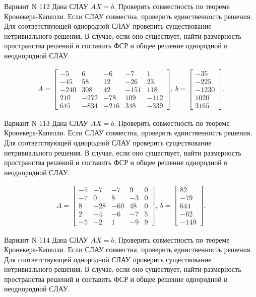\documentclass[11pt]{report}
\begin{document}
Вариант N 112
Дана СЛАУ $AX = b$,
Проверить совместность по теореме Кронекера-Капелли. Если СЛАУ совместна, проверить единственность решения.
Для соответствующей однородной СЛАУ проверить существование нетривиального решения. В случае, если оно существует,
найти размерность пространства решений и составить ФСР и общее решение однородной  и неоднородной СЛАУ.


\begin{align*}
 A = \left[\begin{matrix}-5 & 6 & -6 & -7 & 1\\-45 & 58 & 12 & -26 & 23\\-240 & 308 & 42 & -151 & 118\\210 & -272 & -78 & 109 & -112\\645 & -834 & -216 & 348 & -339\end{matrix}\right],
\ b = \left[\begin{matrix}-35\\-225\\-1230\\1020\\3165\end{matrix}\right]. 
 \end{align*}

Вариант N 113
Дана СЛАУ $AX = b$,
Проверить совместность по теореме Кронекера-Капелли. Если СЛАУ совместна, проверить единственность решения.
Для соответствующей однородной СЛАУ проверить существование нетривиального решения. В случае, если оно существует,
найти размерность пространства решений и составить ФСР и общее решение однородной  и неоднородной СЛАУ.


\begin{align*}
 A = \left[\begin{matrix}-5 & -7 & -7 & 9 & 0\\-7 & 0 & 8 & -3 & 0\\8 & -28 & -60 & 48 & 0\\2 & -4 & -6 & -7 & 5\\-5 & -2 & 1 & -9 & 9\end{matrix}\right],
\ b = \left[\begin{matrix}82\\-79\\644\\-62\\-149\end{matrix}\right]. 
 \end{align*}

Вариант N 114
Дана СЛАУ $AX = b$,
Проверить совместность по теореме Кронекера-Капелли. Если СЛАУ совместна, проверить единственность решения.
Для соответствующей однородной СЛАУ проверить существование нетривиального решения. В случае, если оно существует,
найти размерность пространства решений и составить ФСР и общее решение однородной  и неоднородной СЛАУ.
\end{document}
